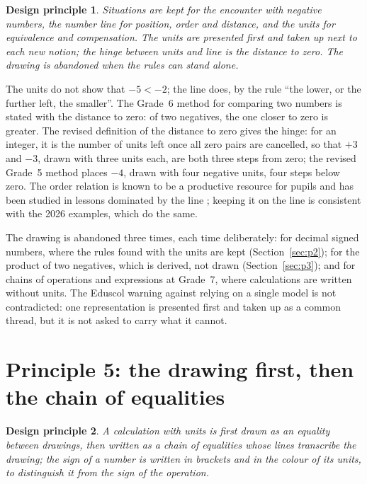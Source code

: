 \documentclass[11pt,a4paper]{article}
\newtheorem{principle}{Design principle}
\theoremstyle{definition}
\begin{document}
\begin{principle}
Situations are kept for the encounter with negative numbers, the number line for position, order and distance, and the units for equivalence and compensation. The units are presented first and taken up next to each new notion; the hinge between units and line is the distance to zero. The drawing is abandoned when the rules can stand alone.
\end{principle}

The units do not show that $-5<-2$; the line does, by the rule ``the lower, or the further left, the smaller''. The Grade~6 method for comparing two numbers is stated with the distance to zero: of two negatives, the one closer to zero is greater. The revised definition of the distance to zero gives the hinge: for an integer, it is the number of units left once all zero pairs are cancelled, so that $+3$ and $-3$, drawn with three units each, are both three steps from zero; the revised Grade~5 method places $-4$, drawn with four negative units, four steps below zero. The order relation is known to be a productive resource for pupils \citep{Bishop2014} and has been studied in lessons dominated by the line \citep{Schindler2017}; keeping it on the line is consistent with the 2026 examples, which do the same.

The drawing is abandoned three times, each time deliberately: for decimal signed numbers, where the rules found with the units are kept (Section~\ref{sec:p2}); for the product of two negatives, which is derived, not drawn (Section~\ref{sec:p3}); and for chains of operations and expressions at Grade~7, where calculations are written without units. The Eduscol warning against relying on a single model \citep{Eduscol2016Relatifs} is not contradicted: one representation is presented first and taken up as a common thread, but it is not asked to carry what it cannot.

\section{Principle 5: the drawing first, then the chain of equalities}\label{sec:p5}

\begin{principle}
A calculation with units is first drawn as an equality between drawings, then written as a chain of equalities whose lines transcribe the drawing; the sign of a number is written in brackets and in the colour of its units, to distinguish it from the sign of the operation.
\end{principle}
\end{document}
